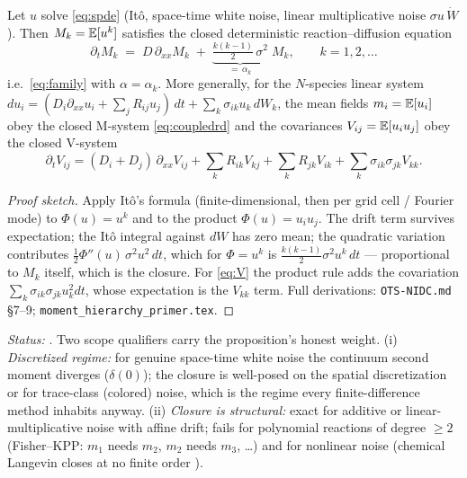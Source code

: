 \begin{proposition}\label{prop:closure}
Let $u$ solve \eqref{eq:spde} (It\^o, space-time white noise, linear
multiplicative noise $\sigma u\,\dot W$). Then $M_k = \mathbb{E}[u^k]$ satisfies the
closed deterministic reaction--diffusion equation
\begin{equation}\label{eq:moments}
\partial_t M_k \;=\; D\,\partial_{xx}M_k \;+\; \underbrace{\tfrac{k(k-1)}2\,\sigma^2}_{=\,\alpha_k}\;M_k,
\qquad k = 1, 2, \dots
\end{equation}
i.e.\ \eqref{eq:family} with $\alpha = \alpha_k$. More generally, for the
$N$-species linear system
$du_i = (D_i\partial_{xx}u_i + \sum_j R_{ij}u_j)\,dt + \sum_k\sigma_{ik}u_k\,dW_k$,
the mean fields $m_i=\mathbb{E}[u_i]$ obey the closed M-system
\eqref{eq:coupledrd} and the covariances $V_{ij}=\mathbb{E}[u_iu_j]$ obey the closed
V-system
\begin{equation}\label{eq:V}
\partial_t V_{ij} = (D_i+D_j)\,\partial_{xx}V_{ij}
+ \sum_k R_{ik}V_{kj} + \sum_k R_{jk}V_{ik}
+ \sum_k \sigma_{ik}\sigma_{jk}V_{kk}.
\end{equation}
\end{proposition}
\begin{proof}[Proof sketch]
Apply It\^o's formula (finite-dimensional, then per grid cell / Fourier mode) to
$\Phi(u)=u^k$ and to the product $\Phi(u)=u_iu_j$. The drift term survives
expectation; the It\^o integral against $dW$ has zero mean; the quadratic
variation contributes $\frac12\Phi''(u)\,\sigma^2u^2\,dt$, which for $\Phi=u^k$
is $\frac{k(k-1)}2\sigma^2u^k\,dt$ --- proportional to $M_k$ itself, which is
the closure. For \eqref{eq:V} the product rule adds the covariation
$\sum_k\sigma_{ik}\sigma_{jk}u_k^2dt$, whose expectation is the $V_{kk}$ term.
Full derivations: \texttt{OTS-NIDC.md} \S7--9; \texttt{moment\_hierarchy\_primer.tex}.
\end{proof}
\noindent\emph{Status:} \tagP. Two scope qualifiers carry the proposition's
honest weight. (i) \emph{Discretized regime:} for genuine space-time white noise
the continuum second moment diverges ($\delta(0)$); the closure is well-posed on
the spatial discretization or for trace-class (colored) noise, which is the
regime every finite-difference method inhabits anyway. (ii) \emph{Closure is
structural:} exact for additive or linear-multiplicative noise with affine
drift; fails for polynomial reactions of degree $\ge2$ (Fisher--KPP: $m_1$ needs
$m_2$, $m_2$ needs $m_3$, \dots) and for nonlinear noise (chemical Langevin
closes at no finite order \citep{jovanovski2025}).

